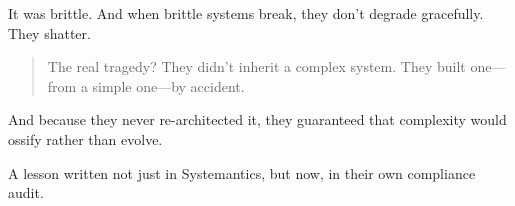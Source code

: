     It was brittle.  
    And when brittle systems break, they don’t degrade gracefully.  
    They shatter.
    
    \medskip
    
    \begin{quote}
    The real tragedy?  
    They didn’t inherit a complex system.
    They built one—from a simple one—by accident.
    \end{quote}
    
    And because they never re-architected it, they guaranteed that complexity would ossify rather than evolve.
    
    A lesson written not just in Systemantics, but now, in their own compliance audit.
    














